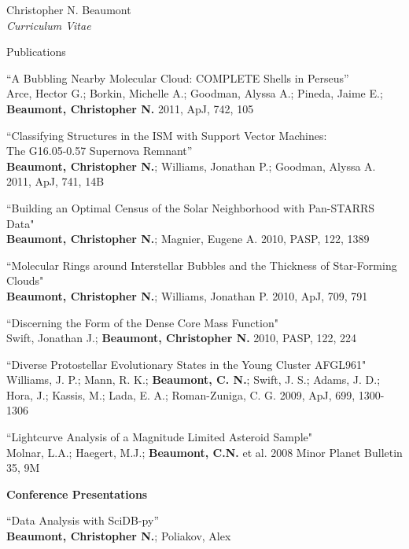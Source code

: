 \documentclass[10pt]{article}
\newenvironment{sublist}{%
	\begin{list}{}{%
		\setlength{\itemsep}{0em}\setlength{\parsep}{0em}%
		\setlength{\topsep}{0em}\setlength{\parskip}{0em}%
	}%
}%
{ \end{list} }
\begin{document}
\begin{cv}{Christopher N. Beaumont\\{\large \itshape Curriculum Vitae}}
\begin{cvlist}{Publications}
\begin{sublist}
	\item ``A Bubbling Nearby Molecular Cloud: COMPLETE Shells in Perseus'' \\
          Arce, Hector G.; Borkin, Michelle A.; Goodman, Alyssa A.; Pineda, Jaime E.; \textbf{Beaumont, Christopher N.} 2011, ApJ, 742, 105 \\
          
	\item ``Classifying Structures in the ISM with Support Vector Machines: \\The G16.05-0.57 Supernova Remnant'' \\
		\textbf{Beaumont, Christopher N.}; Williams, Jonathan P.; Goodman, Alyssa A. 2011, ApJ, 741, 14B\\
	\item ``Building an Optimal Census of the Solar Neighborhood with Pan-STARRS Data" \\
		\textbf{Beaumont, Christopher N.}; Magnier, Eugene A. 2010, PASP, 122, 1389 \\
	\item ``Molecular Rings around Interstellar Bubbles and the Thickness of Star-Forming Clouds" \\
		\textbf{Beaumont, Christopher N.}; Williams, Jonathan P. 2010, ApJ, 709, 791 \\
	\item  ``Discerning the Form of the Dense Core Mass Function" \\
		Swift, Jonathan J.; \textbf{Beaumont, Christopher N.} 2010, PASP, 122, 224 \\
	\item ``Diverse Protostellar Evolutionary States in the Young Cluster AFGL961"  \\
	Williams, J. P.; Mann, R. K.; \textbf{Beaumont, C. N.}; Swift, J. S.; Adams, J. D.; Hora, J.; Kassis, M.; Lada, E. A.; Roman-Zuniga, C. G. 2009, ApJ, 699, 1300-1306\\
	\item ``Lightcurve Analysis of a Magnitude Limited Asteroid Sample" \\
	Molnar, L.A.; Haegert, M.J.; \textbf{Beaumont, C.N.} et al. 2008 Minor Planet Bulletin 35, 9M
	\end{sublist}
	\item \textbf{Conference Presentations}\\
	\begin{sublist}
	\item ``Data Analysis with SciDB-py''\\
	\textbf{Beaumont, Christopher N.}; Poliakov, Alex\\

\end{sublist}
\end{cvlist}
\end{cv}
\end{document}
